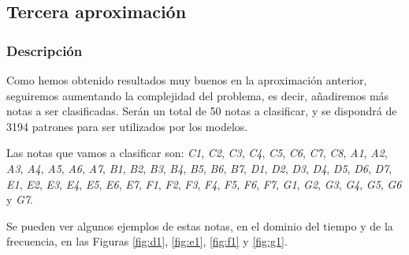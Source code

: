 \documentclass[12pt]{article}
\begin{document}
\newpage
\subsection{Tercera aproximación}
\label{Tercera aproximación}

\subsubsection{Descripción}
Como hemos obtenido resultados muy buenos en la aproximación anterior, seguiremos aumentando la complejidad del problema,
es decir, añadiremos más notas a ser clasificadas. Serán un total de 50 notas a clasificar, y se dispondrá de 
3194 patrones para ser utilizados por los modelos.

\bigskip
Las notas que vamos a clasificar son: 
\textit{C1}, \textit{C2}, \textit{C3}, \textit{C4}, \textit{C5}, \textit{C6}, \textit{C7}, \textit{C8}, 
\textit{A1}, \textit{A2}, \textit{A3}, \textit{A4}, \textit{A5}, \textit{A6}, \textit{A7},
\textit{B1}, \textit{B2}, \textit{B3}, \textit{B4}, \textit{B5}, \textit{B6}, \textit{B7},
\textit{D1}, \textit{D2}, \textit{D3}, \textit{D4}, \textit{D5}, \textit{D6}, \textit{D7},
\textit{E1}, \textit{E2}, \textit{E3}, \textit{E4}, \textit{E5}, \textit{E6}, \textit{E7},
\textit{F1}, \textit{F2}, \textit{F3}, \textit{F4}, \textit{F5}, \textit{F6}, \textit{F7},
\textit{G1}, \textit{G2}, \textit{G3}, \textit{G4}, \textit{G5}, \textit{G6} y \textit{G7}.

Se pueden ver algunos ejemplos de estas notas, en el dominio del tiempo y de la frecuencia, en las Figuras
\ref{fig:d1}, \ref{fig:e1}, \ref{fig:f1} y \ref{fig:g1}.
\end{document}
